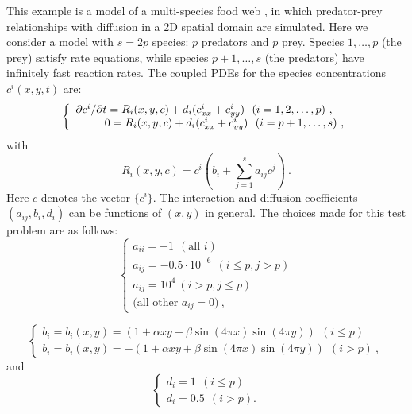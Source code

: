 This example is a model of a multi-species food web \cite{Br86}, in
which predator-prey relationships with diffusion in a 2D spatial
domain are simulated.  Here we consider a model with $s = 2p$ species:
$p$ predators and $p$ prey.  Species $1,\ldots, p$ (the prey) satisfy
rate equations, while species $p+1,\ldots, s$ (the predators) have
infinitely fast reaction rates.  The coupled PDEs for the species
concentrations $c^i(x,y,t)$ are:
\begin{equation}
\left\{ \begin{array}{l}
               \partial c^i / \partial t = R_i(x,y,c) + d_i 
( c^i_{xx} + c^i_{yy} ) ~ ~ (i = 1,2,\ldots,p) ~, \\
                \hspace*{.36in}        0 = R_i(x,y,c) + d_i 
( c^i_{xx} + c^i_{yy} ) ~ ~ (i = p+1,\ldots,s) ~,
\end{array} \right.                                       \label{ppsys}
\end{equation}
with
\[
R_i(x,y,c) = c^i (b_i + \sum_{j=1}^s a_{ij} c^j) ~.
\]
Here $c$ denotes the vector $\{c^i\}$.
The interaction and diffusion coefficients $(a_{ij},b_i,d_i)$ can be
functions of $(x,y)$ in general. The choices made for this test
problem are as follows:
\[
\left\{ \begin{array}{l}
a_{ii} = -1 ~ ~ (\mbox{all } i) \\
a_{ij} = -0.5 \cdot 10^{-6} ~ ~ ( i \leq p , j > p ) \\
a_{ij} = 10^4 ~ ( i > p , j \leq p ) \\
\mbox{(all other } a_{ij} = 0 ) ~,
\end{array} \right.
\]

\[
\left\{ \begin{array}{l}
b_i = b_i(x,y) =  (1 + \alpha xy + \beta \sin(4\pi x)\sin(4\pi y) )
                   ~~ ( i \leq p ) \\
b_i = b_i(x,y) = -(1 + \alpha xy + \beta \sin(4\pi x)\sin(4\pi y) )
                   ~~ ( i > p ) ~,
\end{array} \right.
\]
and
\[
\left\{ \begin{array}{l}
d_i =   1 ~ ~ ( i \leq p ) \\
d_i = 0.5 ~ ~ ( i > p ) .
\end{array} \right.
\]

